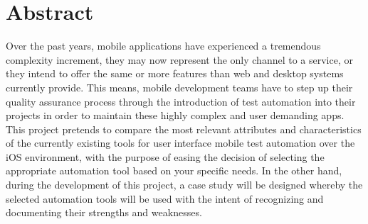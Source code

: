 %
\chapter*{Abstract}
\label{sec:abstract}
\vspace*{-10mm}

Over the past years, mobile applications have experienced a tremendous complexity increment, they may now represent the only channel to a service, or they intend to offer the same or more features than web and desktop systems currently provide. This means, mobile development teams have to step up their quality assurance process through the introduction of test automation into their projects in order to maintain these highly complex and user demanding apps. This project pretends to compare the most relevant attributes and characteristics of the currently existing tools for user interface mobile test automation over the iOS environment, with the purpose of easing the decision of selecting the appropriate automation tool based on your specific needs. In the other hand, during the development of this project, a case study will be designed whereby the selected automation tools will be used with the intent of recognizing and documenting their strengths and weaknesses.

\vspace*{20mm}
